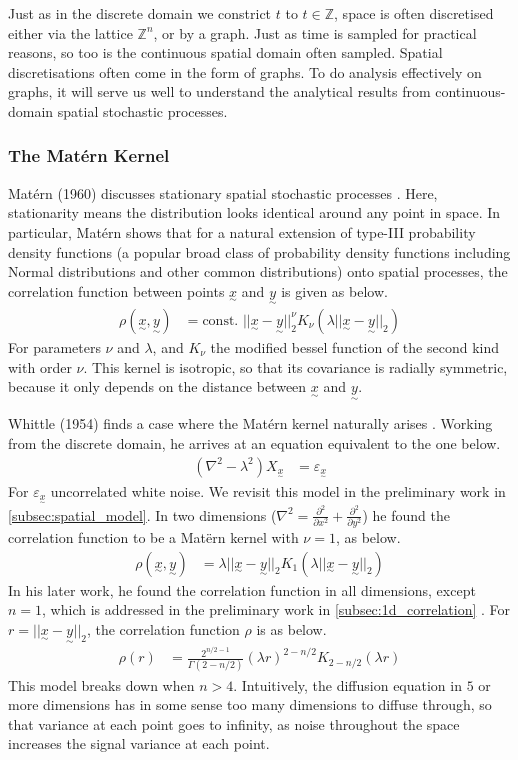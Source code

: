 \documentclass[12pt,a4paper]{article} %
\newcommand{\ve}[1]{\underset{\sim}{#1}}
\begin{document}
Just as in the discrete domain we constrict $t$ to $t\in\mathbb{Z}$, space is often discretised either via the lattice $\mathbb{Z}^n$, or by a graph. Just as time is sampled for practical reasons, so too is the continuous spatial domain often sampled. Spatial discretisations often come in the form of graphs. To do analysis effectively on graphs, it will serve us well to understand the analytical results from continuous-domain spatial stochastic processes.
\subsubsection{The Mat\'{e}rn Kernel}
\label{subsec:matern}
Mat\'{e}rn (1960) discusses stationary spatial stochastic processes \cite{matern}. Here, stationarity means the distribution looks identical around any point in space. In particular, Mat\'{e}rn shows that for a natural extension of type-III probability density functions (a popular broad class of probability density functions including Normal distributions and other common distributions) onto spatial processes, the correlation function between points $\ve{x}$ and $\ve{y}$ is given as below.
\begin{align*}
    \rho(\ve{x},\ve{y})&=\text{const. }||\ve{x}-\ve{y}||_2^\nu K_\nu(\lambda||\ve{x}-\ve{y}||_2)
\end{align*}
For parameters $\nu$ and $\lambda$, and $K_\nu$ the modified bessel function of the second kind with order $\nu$. This kernel is isotropic, so that its covariance is radially symmetric, because it only depends on the distance between $\ve{x}$ and $\ve{y}$.

Whittle (1954) finds a case where the Mat\'{e}rn kernel naturally arises \cite{whittle2}. Working from the discrete domain, he arrives at an equation equivalent to the one below.
\begin{align*}
    (\nabla^2-\lambda^2)X_{\ve{x}}&=\varepsilon_{\ve{x}}
\end{align*}
For $\varepsilon_{\ve{x}}$ uncorrelated white noise. We revisit this model in the preliminary work in \ref{subsec:spatial_model}. In two dimensions ($\nabla^2=\frac{\partial^2}{\partial x^2}+\frac{\partial^2}{\partial y^2}$) he found the correlation function to be a Mat\"{e}rn kernel with $\nu=1$, as below.
\begin{align*}
    \rho(\ve{x},\ve{y})&=\lambda||\ve{x}-\ve{y}||_2 K_1(\lambda||\ve{x}-\ve{y}||_2)
\end{align*}
In his later work, he found the correlation function in all dimensions, except $n=1$, which is addressed in the preliminary work in \ref{subsec:1d_correlation} \cite{whittle}. For $r=||\ve{x}-\ve{y}||_2$, the correlation function $\rho$ is as below.
\begin{align*}
    \rho(r)&=\frac{2^{n/2-1}}{\Gamma(2-n/2)}(\lambda r)^{2-n/2}K_{2-n/2}(\lambda r)
\end{align*}
This model breaks down when $n>4$. Intuitively, the diffusion equation in $5$ or more dimensions has in some sense too many dimensions to diffuse through, so that variance at each point goes to infinity, as noise throughout the space increases the signal variance at each point.
\end{document}
